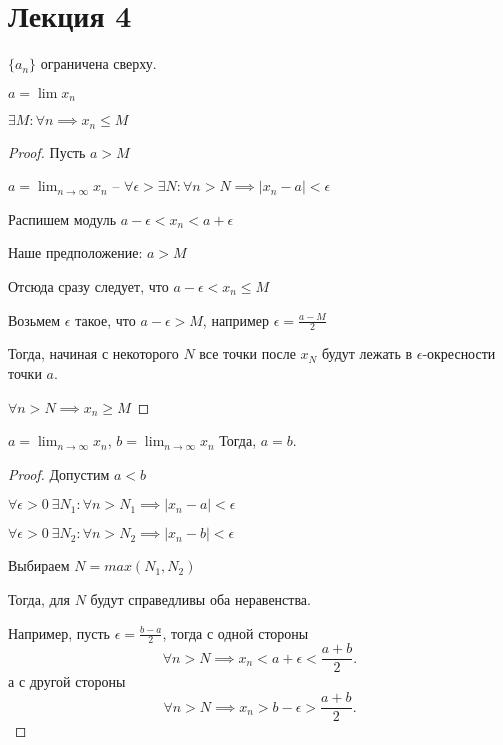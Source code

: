 \section{Лекция 4}

\begin{statement}
    $\{a_n\}$ ограничена сверху. 

    $a = \lim x_n$
    
    $\exists M : \forall n \implies x_n \leq M$
\end{statement}

\begin{proof}
    Пусть $a > M$

    $a = \lim_{n \to \infty} x_n$ -- $\forall \epsilon > \exists N : \forall n > N \implies |x_n - a| < \epsilon$

    Распишем модуль
    $a - \epsilon < x_n < a + \epsilon$

    Наше предположение: $a > M$

    Отсюда сразу следует, что $a - \epsilon < x_n \leq M$

    Возьмем $\epsilon$ такое, что $a - \epsilon > M$, например $\epsilon = \frac{a - M}{2}$

    Тогда, начиная с некоторого $N$ все точки после $x_N$ будут лежать в $\epsilon$-окресности точки $a$.

    $\forall n > N \implies x_n \geq M$
\end{proof}

\begin{statement}
    $a = \lim_{n \to \infty} x_n$, $b = \lim_{n \to \infty} x_n$
    Тогда, $a = b$.
\end{statement}

\begin{proof}
   Допустим $a < b$ 

   $\forall \epsilon > 0 \ \exists N_1 : \forall n > N_1 \implies |x_n - a| < \epsilon$
    
   $\forall \epsilon > 0 \ \exists N_2 : \forall n > N_2 \implies |x_n - b| < \epsilon$

    Выбираем $N = max(N_1, N_2)$

    Тогда, для $N$ будут справедливы оба неравенства.

    Например, пусть $\epsilon = \frac{b - a}{2}$, тогда с одной стороны 
    \begin{equation*}
        \forall n > N \implies x_n < a + \epsilon < \frac{a + b}{2}  
    .\end{equation*}
    а с другой стороны 
    \begin{equation*}
        \forall n > N \implies x_n > b - \epsilon > \frac{a + b}{2}
    .\end{equation*}
\end{proof}


